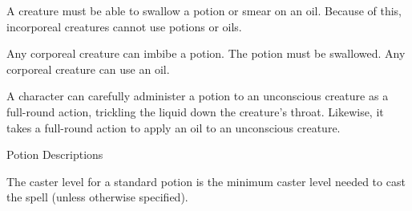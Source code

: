 A creature must be able to swallow a potion or smear on an oil. Because of this, 
incorporeal creatures cannot use potions or oils. 

Any corporeal creature can imbibe a potion. The potion must be swallowed. Any corporeal 
creature can use an oil.

A character can carefully administer a potion to an unconscious creature as a full-round 
action, trickling the liquid down the creature's throat. Likewise, it takes a full-round 
action to apply an oil to an unconscious creature.

\vspace{12pt}
Potion Descriptions

The caster level for a standard potion is the minimum caster level needed to cast 
the spell (unless otherwise specified).


